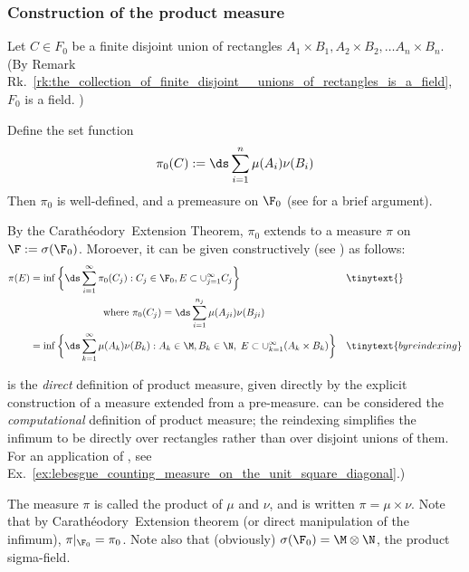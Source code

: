 \documentclass{article} %
\newcommand{\Caratheodory}{Carath\'eodory}
\begin{document}
\subsubsection{Construction of the product measure} \label{sec:construction_of_the_product_measure}

Let $C \in F_0$ be a finite disjoint union of rectangles $A_1 \times B_1, A_2 \times B_2, \hdots A_n \times B_n$.  {\tiny  (By Remark Rk.~\ref{rk:the_collection_of_finite_disjoint__unions_of_rectangles_is_a_field},  $F_0$ is a field. ) }

Define the set function 
\[ \pi_0 (C) := \ds\sum_{i=1}^n \mu(A_i) \nu(B_i) \]
Then $\pi_0$ is well-defined, and a premeasure on $\F_0$ (see \cite[pp.64]{folland1999real} for a brief argument). 

By the \Caratheodory~Extension Theorem, $\pi_0$ extends to a measure $\pi$ on $\F:=\sigma(\F_0)$.  Moroever, it can be given constructively (see ) as follows:
\begin{subequations}
\begin{align}
\pi(E) &= \inf \bigg\{ \ds\sum_{i=1}^\infty \pi_0 (C_j) : C_j \in \F_0,  E \subset \cup_{j=1}^\infty C_j \bigg\} && \tinytext{} \label{eqn:direct_def_of_product_measure} \\	
& \quad \quad \quad \quad  \quad \quad \quad  \text{ where }  \pi_0 (C_j) = \ds\sum_{i=1}^{n_j} \mu(A_{ji}) \nu(B_{ji})  \nonumber \\
&=\inf \bigg\{ \ds\sum_{k=1}^\infty \mu(A_k) \nu(B_k) : A_k \in \M, B_k \in \N, \;  E \subset \cup_{k=1}^\infty (A_k \times B_k) \bigg \} && \tinytext{by reindexing} \label{eqn:computational_def_of_product_measure}	
\end{align}
\end{subequations}

{\tiny {} is the \textit{direct} definition of product measure, given directly by the explicit construction of a measure extended from a pre-measure.    can be considered the \textit{computational} definition of product measure; the reindexing simplifies the infimum to be directly over rectangles rather than over disjoint unions of them. For an application of , see Ex.~\ref{ex:lebesgue_counting_measure_on_the_unit_square_diagonal}.) }

The measure $\pi$ is called the product of $\mu$ and $\nu$, and is written $\pi = \mu \times \nu$.  Note that by \Caratheodory~Extension theorem {\tiny (or direct manipulation of the infimum)}, $\pi|_{\F_0} = \pi_0$.  Note also that (obviously) $\sigma(\F_0) = \M \otimes \N$, the product sigma-field.  
\end{document}
